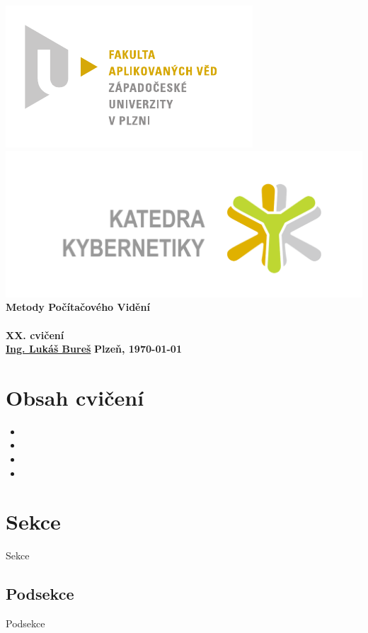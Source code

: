 \documentclass[12pt, a4paper]{article}
\newcommand{\cisloCviceni}{XX. cvičení}
\begin{document}
 
\begin{titlepage}
\begin{center}
	\includegraphics[trim = 0.6cm 0.5cm 0.9cm 0.5cm, scale=1]{./FAV_logo_cz.pdf}
	\hspace*{\fill}
	\includegraphics[trim = 3.5cm 1.5cm 2.6cm 2cm, scale=0.295]{./KKY_logo_cz.pdf}\\
	\vspace*{\fill}
	\textbf{\Huge{Metody Počítačového Vidění \\ ~ \\ \cisloCviceni}}\\
	\vspace*{\fill}
	\textbf{\large{\href{mailto:LBures@kky.zcu.cz}{Ing. Lukáš Bureš}}} \hfill \textbf{\large{Plzeň, \today}}
\end{center}
\end{titlepage}








\section*{Obsah cvičení}
\begin{itemize}
	\item 
	\item  
	\item 
	\item 
\end{itemize}









\section{Sekce}
\par{Sekce}

\subsection{Podsekce}
\par{Podsekce}
\end{document}
